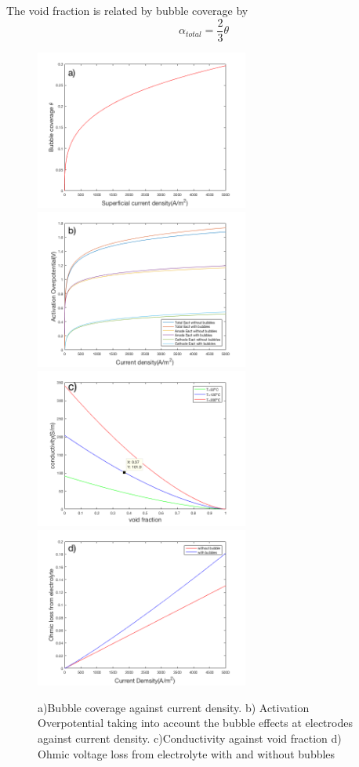 The void fraction is related by bubble coverage by\cite{activation2}
\begin{equation}
\alpha_{total} = \frac{2}{3}\theta
\end{equation}

\begin{figure}[h] 
\centering
\includegraphics[width=7cm]{coverage}
\includegraphics[width=7cm] {actbubble} 
\includegraphics[width=7cm]{void2}
\includegraphics[width=7cm]{bubble3}
\caption{a)Bubble coverage against current density. b) Activation Overpotential taking into account the bubble effects at electrodes against current density. c)Conductivity against void fraction d) Ohmic voltage loss from electrolyte with and without bubbles} 
\end{figure} 



